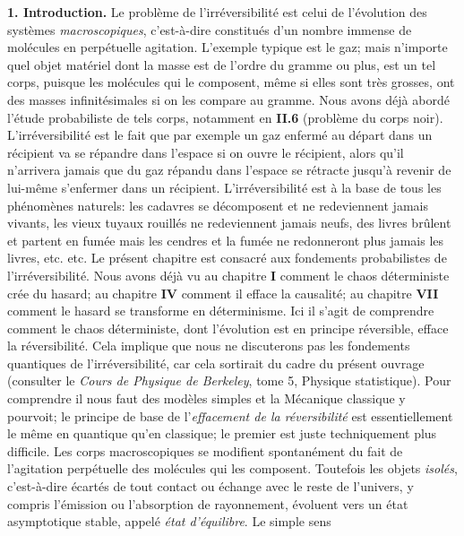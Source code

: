 { \bf 1. Introduction.}
\medskip
Le probl\`eme de l'irr\'eversibilit\'e est celui de l'\'evolution des 
syst\`emes {\it macroscopiques}, c'est-\`a-dire constitu\'es d'un nombre 
immense de mol\'ecules en perp\'etuelle agitation. L'exemple typique est le 
gaz; mais n'importe quel objet mat\'eriel dont la masse est de l'ordre du 
gramme ou plus, est un tel corps, puisque les mol\'ecules qui le composent, 
m\^eme si elles sont tr\`es grosses, ont des masses infinit\'esimales si 
on les compare au gramme. Nous avons d\'ej\`a abord\'e l'\'etude probabiliste 
de tels corps, notamment en {\bf II.6} (probl\`eme du corps noir). 
L'irr\'eversibilit\'e est le fait que par exemple un gaz enferm\'e au 
d\'epart dans un r\'ecipient va se r\'epandre dans l'espace si on ouvre 
le r\'ecipient, alors qu'il n'arrivera jamais que du gaz r\'epandu dans 
l'espace se r\'etracte jusqu'\`a revenir de lui-m\^eme s'enfermer dans un
r\'ecipient. 
L'irr\'eversibilit\'e est \`a la base de tous les ph\'enom\`enes naturels: 
les cadavres se d\'ecomposent et ne redeviennent jamais vivants, les vieux 
tuyaux rouill\'es ne redeviennent jamais neufs, des livres br\^ulent et 
partent en fum\'ee mais les cendres et la fum\'ee ne redonneront plus jamais 
les livres, etc. etc. 
\medskip
Le pr\'esent chapitre est consacr\'e aux fondements probabilistes de 
l'irr\'e\-ver\-si\-bi\-lit\'e. Nous avons d\'ej\`a vu au chapitre 
{\bf I} comment le chaos d\'eterministe cr\'ee du hasard;  au 
chapitre {\bf IV} comment il efface la causalit\'e;  au chapitre 
{\bf VII} comment le hasard se transforme en d\'eterminisme. 
Ici il s'agit de comprendre comment le chaos d\'eterministe, dont
l'\'evolution est en principe r\'eversible, efface la r\'eversibilit\'e. 
Cela implique que nous ne discuterons pas les fondements quantiques de 
l'irr\'eversibilit\'e, car cela sortirait du cadre du pr\'esent ouvrage 
(consulter le {\it Cours de Physique de Berkeley}, tome 5, Physique 
statistique). Pour comprendre il nous faut des mod\`eles simples et la 
M\'ecanique classique y pourvoit; le principe de base de l'{\it effacement 
de la r\'eversibilit\'e} est essentiellement le m\^eme en quantique qu'en
classique; le premier est juste techniquement plus difficile.
\medskip
Les corps macroscopiques se modifient spontan\'ement du fait de l'agitation
perp\'etuelle des mol\'ecules qui les composent. Toutefois les objets 
{\it isol\'es}, c'est-\`a-dire \'ecart\'es de tout contact ou \'echange 
avec le reste de l'univers, y compris l'\'emission ou l'absorption de
rayonnement, \'evoluent vers un \'etat 
asymptotique stable, appel\'e {\it \'etat d'\'equilibre}. Le simple sens 
